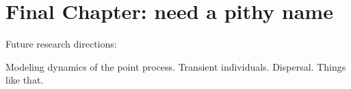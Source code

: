 


\chapter{Final Chapter: need a pithy name}
\label{chapt.final}

\vspace{0.3cm}


Future research directions:

 Modeling dynamics of the point process. Transient individuals. Dispersal. Things like that.











